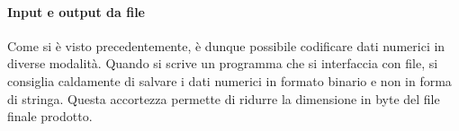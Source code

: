 \documentclass[class=book, crop=false, oneside]{standalone}
\begin{document}
\paragraph*{Input e output da file}
Come si è visto precedentemente, è dunque possibile codificare dati numerici in diverse modalità. Quando si scrive un programma che si interfaccia con file, si consiglia caldamente di salvare i dati numerici in formato binario e non in forma di stringa. Questa accortezza permette di ridurre la dimensione in byte del file finale prodotto.
\end{document}
